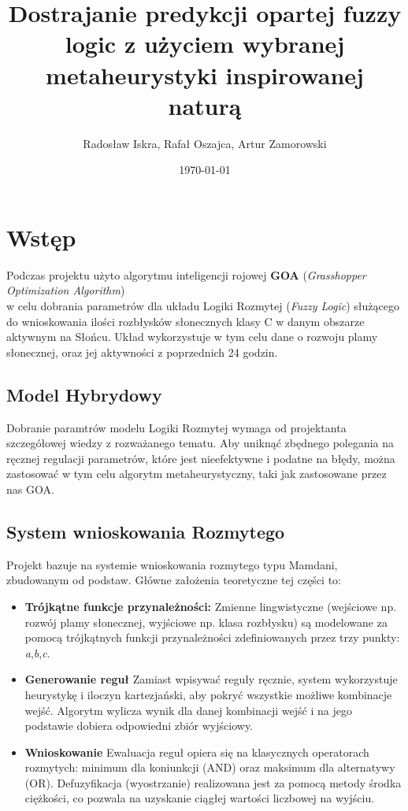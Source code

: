 \documentclass[12pt, a4paper]{article}
\title{Dostrajanie predykcji opartej fuzzy logic z użyciem wybranej metaheurystyki inspirowanej naturą}
\author{Radosław Iskra, Rafał Oszajca, Artur Zamorowski}
\date{\today}
\begin{document}
\maketitle
\tableofcontents
\newpage

\section{Wstęp}
Podczas projektu użyto algorytmu inteligencji rojowej \textbf{GOA} (\textit{Grasshopper Optimization Algorithm}) \\ 
w celu dobrania parametrów dla układu Logiki Rozmytej (\textit{Fuzzy Logic}) służącego do 
wnioskowania ilości rozbłysków słonecznych klasy C w danym obszarze aktywnym na Słońcu. 
Układ wykorzystuje w tym celu dane o rozwoju plamy słonecznej, oraz jej aktywności z poprzednich 24 godzin.

\subsection{Model Hybrydowy}
Dobranie paramtrów modelu Logiki Rozmytej wymaga od projektanta szczegółowej wiedzy z rozważanego tematu.
Aby uniknąć zbędnego polegania na ręcznej regulacji parametrów, które jest nieefektywne i podatne na błędy, można
zastosować w tym celu algorytm metaheurystyczny, taki jak zastosowane przez nas GOA.

\subsection{System wnioskowania Rozmytego}
Projekt bazuje na systemie wnioskowania rozmytego typu Mamdani, zbudowanym od podstaw. Główne założenia teoretyczne tej części to:
\begin{itemize}
\item \textbf{Trójkątne funkcje przynależności:} Zmienne lingwistyczne (wejściowe np. rozwój plamy słonecznej, 
    wyjściowe np. klasa rozbłysku) są modelowane za pomocą trójkątnych funkcji przynależności 
    zdefiniowanych przez trzy punkty: \textit{a},\textit{b},\textit{c}.
\item \textbf{Generowanie reguł} Zamiast wpisywać reguły ręcznie, system wykorzystuje heurystykę i iloczyn kartezjański, aby pokryć wszystkie możliwe kombinacje wejść. Algorytm wylicza wynik dla danej kombinacji wejść i na jego podstawie dobiera odpowiedni zbiór wyjściowy.
\item \textbf{Wnioskowanie} Ewaluacja reguł opiera się na klasycznych operatorach rozmytych: minimum dla koniunkcji (AND) oraz maksimum dla alternatywy (OR). Defuzyfikacja (wyostrzanie) realizowana jest za pomocą metody środka ciężkości, co pozwala na uzyskanie ciągłej wartości liczbowej na wyjściu.
\end{itemize}
\end{document}
